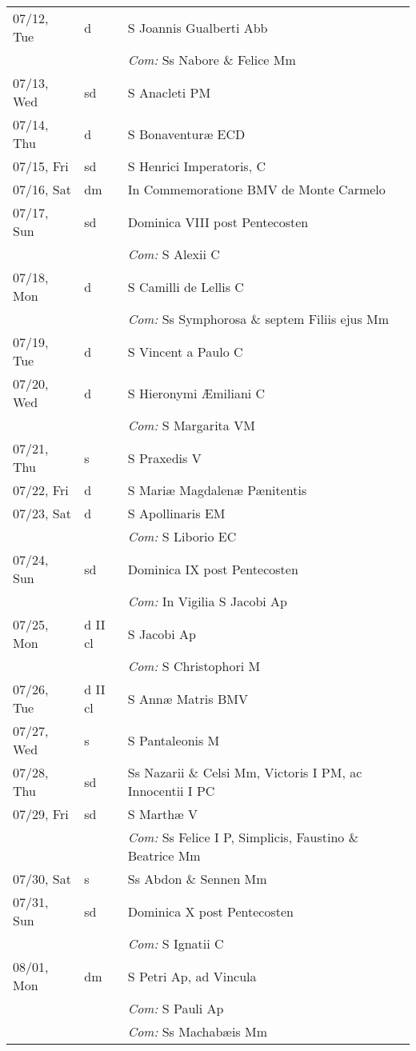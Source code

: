 \documentclass[10pt]{article}
\begin{document}
\begin{longtable}{ l l l }
07/12, Tue & d & S Joannis Gualberti Abb\\
 & & \textit{Com:} Ss Nabore \& Felice Mm\\
07/13, Wed & sd & S Anacleti PM\\
07/14, Thu & d & S Bonaventuræ ECD\\
07/15, Fri & sd & S Henrici Imperatoris, C\\
07/16, Sat & dm & In Commemoratione BMV de Monte Carmelo\\
07/17, Sun & sd & Dominica VIII post Pentecosten\\
 & & \textit{Com:} S Alexii C\\
07/18, Mon & d & S Camilli de Lellis C\\
 & & \textit{Com:} Ss Symphorosa \& septem Filiis ejus Mm\\
07/19, Tue & d & S Vincent a Paulo C\\
07/20, Wed & d & S Hieronymi Æmiliani C\\
 & & \textit{Com:} S Margarita VM\\
07/21, Thu & s & S Praxedis V\\
07/22, Fri & d & S Mariæ Magdalenæ Pænitentis\\
07/23, Sat & d & S Apollinaris EM\\
 & & \textit{Com:} S Liborio EC\\
07/24, Sun & sd & Dominica IX post Pentecosten\\
 & & \textit{Com:} In Vigilia S Jacobi Ap\\
07/25, Mon & d II cl & S Jacobi Ap\\
 & & \textit{Com:} S Christophori M\\
07/26, Tue & d II cl & S Annæ Matris BMV\\
07/27, Wed & s & S Pantaleonis M\\
07/28, Thu & sd & Ss Nazarii \& Celsi Mm, Victoris I PM, ac Innocentii I PC\\
07/29, Fri & sd & S Marthæ V\\
 & & \textit{Com:} Ss Felice I P, Simplicis, Faustino \& Beatrice Mm\\
07/30, Sat & s & Ss Abdon \& Sennen Mm\\
07/31, Sun & sd & Dominica X post Pentecosten\\
 & & \textit{Com:} S Ignatii C\\
08/01, Mon & dm & S Petri Ap, ad Vincula\\
 & & \textit{Com:} S Pauli Ap\\
 & & \textit{Com:} Ss Machabæis Mm\\

\end{longtable}
\end{document}
